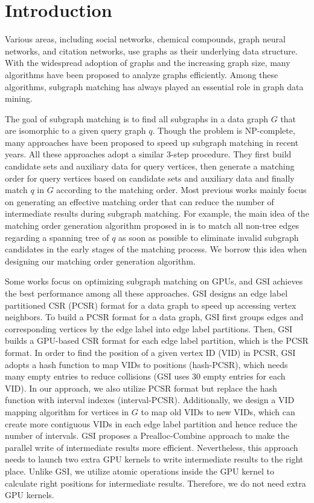 \section{Introduction}
Various areas, including social networks, chemical compounds, graph neural networks, and citation networks, use graphs as their underlying data structure. With the widespread adoption of graphs and the increasing graph size, many algorithms have been proposed to analyze graphs efficiently. Among these algorithms, subgraph matching has always played an essential role in graph data mining.

The goal of subgraph matching is to find all subgraphs in a data graph $G$ that are isomorphic to a given query graph $q$. Though the problem is NP-complete, many approaches  \cite{bhattarai2019ceci,guo2020gpu,tran2015fast,shi2020graphpi,bi2016efficient,zeng2020gsi,sun2020subgraph,guo2020exploiting,sun2020rapidmatch,lin2016network} have been proposed to speed up subgraph matching in recent years. All these approaches adopt a similar 3-step procedure. They first build candidate sets and auxiliary data for query vertices, then generate a matching order for query vertices based on candidate sets and auxiliary data and finally match $q$ in $G$ according to the matching order. Most previous works mainly focus on generating an effective matching order that can reduce the number of intermediate results during subgraph matching. For example, the main idea of the matching order generation algorithm proposed in \cite{bi2016efficient} is to match all non-tree edges regarding a spanning tree of $q$ as soon as possible to eliminate invalid subgraph candidates in the early stages of the matching process. We borrow this idea when designing our matching order generation algorithm.

Some works \cite{lin2016network,guo2020gpu,tran2015fast,zeng2020gsi,guo2020exploiting} focus on optimizing subgraph matching on GPUs, and GSI \cite{zeng2020gsi} achieves the best performance among all these approaches. GSI designs an edge label partitioned CSR (PCSR) format for a data graph to speed up accessing vertex neighbors. To build a PCSR format for a data graph, GSI first groups edges and corresponding vertices by the edge label into edge label partitions. Then, GSI builds a GPU-based CSR format for each edge label partition, which is the PCSR format. In order to find the position of a given vertex ID (VID) in PCSR, GSI adopts a hash function to map VIDs to positions (hash-PCSR), which needs many empty entries to reduce collisions (GSI uses 30 empty entries for each VID). In our approach, we also utilize PCSR format but replace the hash function with interval indexes (interval-PCSR). Additionally, we design a VID mapping algorithm for vertices in $G$ to map old VIDs to new VIDs, which can create more contiguous VIDs in each edge label partition and hence reduce the number of intervals. GSI proposes a Prealloc-Combine approach to make the parallel write of intermediate results more efficient. Nevertheless, this approach needs to launch two extra GPU kernels to write intermediate results to the right place. Unlike GSI, we utilize atomic operations inside the GPU kernel to calculate right positions for intermediate results. Therefore, we do not need extra GPU kernels.

